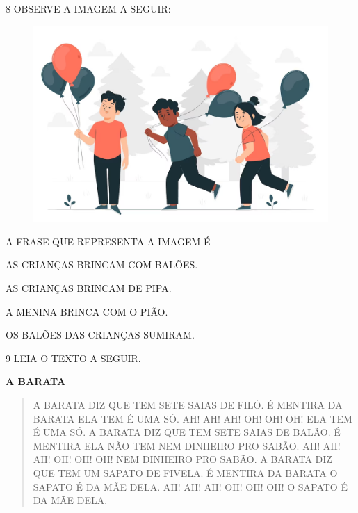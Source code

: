 \num{8} OBSERVE A IMAGEM A SEGUIR:

\begin{figure}[H]
\centering
\includegraphics[width=\textwidth]{./media/image217.png}
\end{figure}

A FRASE QUE REPRESENTA A IMAGEM É

\begin{escolha}

\item AS CRIANÇAS BRINCAM COM BALÕES.

\item AS CRIANÇAS BRINCAM DE PIPA.

\item A MENINA BRINCA COM O PIÃO.

\item OS BALÕES DAS CRIANÇAS SUMIRAM.

\end{escolha}

\num{9} LEIA O TEXTO A SEGUIR.

\begin{myquote}
\textbf{A BARATA}

\begin{verse}
A BARATA DIZ QUE TEM
SETE SAIAS DE FILÓ.
É MENTIRA DA BARATA
ELA TEM É UMA SÓ.
AH! AH! AH!
OH! OH! OH!
ELA TEM É UMA SÓ.
A BARATA DIZ QUE TEM
SETE SAIAS DE BALÃO.
É MENTIRA ELA NÃO TEM
NEM DINHEIRO PRO SABÃO.
AH! AH! AH!
OH! OH! OH!
NEM DINHEIRO PRO SABÃO.
A BARATA DIZ QUE TEM
UM SAPATO DE FIVELA.
É MENTIRA DA BARATA
O SAPATO É DA MÃE DELA.
AH! AH! AH!
OH! OH! OH!
O SAPATO É DA MÃE DELA.
\end{verse}

\end{myquote}

